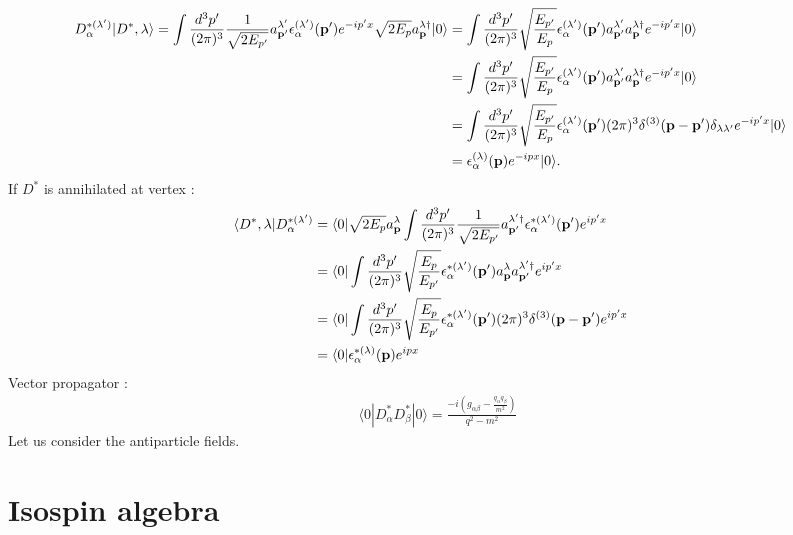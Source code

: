\documentclass[aps,prd,preprintnumbers,showpacs,showkeys,nofootinbib,
superscriptaddress,fleqn,floatfix,tightenlines, 10pt]{revtex4-1}
\begin{document}
\begin{align*}
	D_\alpha^{*(\lambda')} |D^*, \lambda \rangle = \int{\frac{d^3 p'}{(2\pi)^3}
	\frac{1}{\sqrt{2 E_{p'}}} a_\mathbf{p'}^{\lambda'} \epsilon_\alpha^{(\lambda')}(\mathbf{p'}) e^{-ip'x}} \sqrt{2 E_p}
	a_\mathbf{p}^{\lambda \dagger} |0\rangle
	&= \int{\frac{d^3 p'}{(2\pi)^3} \sqrt{\frac{E_{p'}}{E_p}} \epsilon_\alpha^{(\lambda')} (\mathbf{p'})
	a_\mathbf{p'}^{\lambda'} a_\mathbf{p}^{\lambda \dagger} } e^{-ip'x}|0\rangle \cr
	&= \int{\frac{d^3 p'}{(2\pi)^3} \sqrt{\frac{E_{p'}}{E_p}} \epsilon_\alpha^{(\lambda')} (\mathbf{p'})
	a_\mathbf{p'}^{\lambda'} a_\mathbf{p}^{\lambda \dagger} } e^{-ip'x}|0\rangle \cr
	&= \int{\frac{d^3 p'}{(2\pi)^3} \sqrt{\frac{E_{p'}}{E_p}} \epsilon_\alpha^{(\lambda')} (\mathbf{p'})
	(2\pi)^3 \delta^{(3)} (\mathbf{p}-\mathbf{p}') \delta_{\lambda \lambda'}} e^{-ip'x}|0\rangle \cr
	&= \epsilon_\alpha^{(\lambda)}(\mathbf{p}) e^{-ipx} |0\rangle .
\end{align*}
If $D^*$ is annihilated at vertex :
\begin{align*}
	\langle D^*, \lambda | D_\alpha^{*(\lambda')} &= \langle 0 | \sqrt{2E_p} a_\mathbf{p}^\lambda
	\int{\frac{d^3 p'}{(2\pi)^3}} \frac{1}{\sqrt{2E_{p'}}} a_{\mathbf{p}'}^{\lambda' \dagger}
	\epsilon_\alpha^{*(\lambda')} (\mathbf{p}') e^{ip'x} \cr
	&= \langle 0 | \int{\frac{d^3 p'}{(2\pi)^3}} \sqrt{\frac{E_p}{E_{p'}}}
	\epsilon_\alpha^{*(\lambda')} (\mathbf{p}') a_\mathbf{p}^\lambda a_{\mathbf{p}'}^{\lambda' \dagger} e^{ip'x} \cr
	&= \langle 0 | \int{\frac{d^3 p'}{(2\pi)^3}} \sqrt{\frac{E_p}{E_{p'}}}
	\epsilon_\alpha^{*(\lambda')} (\mathbf{p}') (2\pi)^3 \delta^{(3)}(\mathbf{p} - \mathbf{p'}) e^{ip'x} \cr
	&= \langle 0 | \epsilon_\alpha^{*(\lambda)} (\mathbf{p}) e^{ipx}
\end{align*}
Vector propagator :
\begin{align}
	\langle 0 | D_\alpha^* D_\beta^*| 0 \rangle = \frac{-i\left(g_{\alpha \beta} -
	\frac{q_\alpha q_\beta}{m^2}\right)}{q^2 - m^2}
\end{align}
Let us consider the antiparticle fields.

\section{Isospin algebra}
\end{document}

